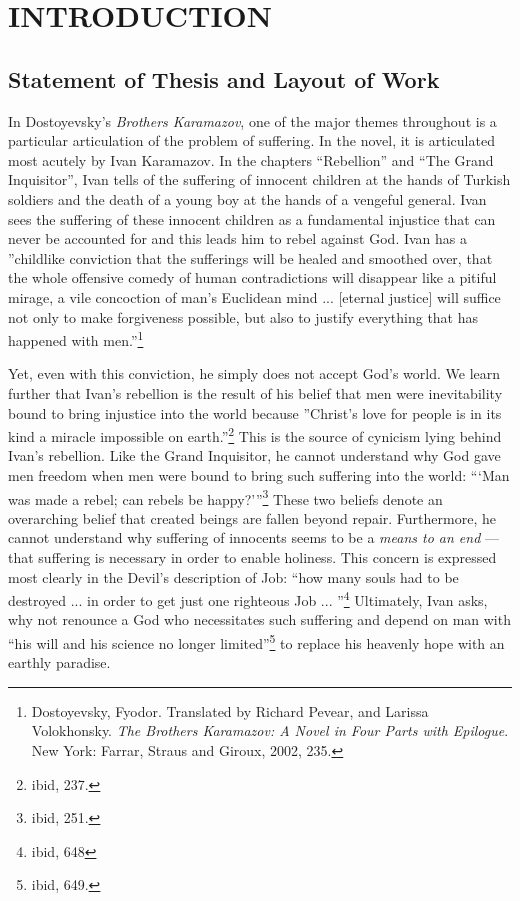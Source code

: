 \tableofcontents
\chapter{INTRODUCTION}

\pagestyle{myheadings}

\label{introduction}

\section{Statement of Thesis and Layout of Work}

In Dostoyevsky's \emph{Brothers Karamazov}, one of the major themes throughout is a particular articulation of the problem of suffering. In the novel, it is articulated most acutely by Ivan Karamazov. In the chapters ``Rebellion'' and ``The Grand Inquisitor'', Ivan tells of the suffering of innocent children at the hands of Turkish soldiers and the death of a young boy at the hands of a vengeful general. Ivan sees the suffering of these innocent children as a fundamental injustice that can never be accounted for and this leads him to rebel against God. Ivan has a ''childlike conviction that the sufferings will be healed and smoothed over, that the whole offensive comedy of human contradictions will disappear like a pitiful mirage, a vile concoction of man's Euclidean mind ... [eternal justice] will suffice not only to make forgiveness possible, but also to justify everything that has happened with men.''\footnote{Dostoyevsky, Fyodor. Translated by Richard Pevear, and Larissa Volokhonsky. \emph{The Brothers Karamazov: A Novel in Four Parts with Epilogue}. New York: Farrar, Straus and Giroux, 2002, 235.}

Yet, even with this conviction, he simply does not accept God's world. We learn further that Ivan's rebellion is the result of his belief that men were inevitability bound to bring injustice into the world because ''Christ's love for people is in its kind a miracle impossible on earth.''\footnote{ibid, 237.} This is the source of cynicism lying behind Ivan's rebellion. Like the Grand Inquisitor, he cannot understand why God gave men freedom when men were bound to bring such suffering into the world: ```Man was made a rebel; can rebels be happy?'''\footnote{ibid, 251.} These two beliefs denote an overarching belief that created beings are fallen beyond repair. Furthermore, he cannot understand why suffering of innocents seems to be a \emph{means to an end} --- that suffering is necessary in order to enable holiness. This concern is expressed most clearly in the Devil's description of Job: ``how many souls had to be destroyed ... in order to get just one righteous Job ... ''\footnote{ibid, 648} Ultimately, Ivan asks, why not renounce a God who necessitates such suffering and depend on man with ``his will and his science no longer limited''\footnote{ibid, 649.} to replace his heavenly hope with an earthly paradise.

